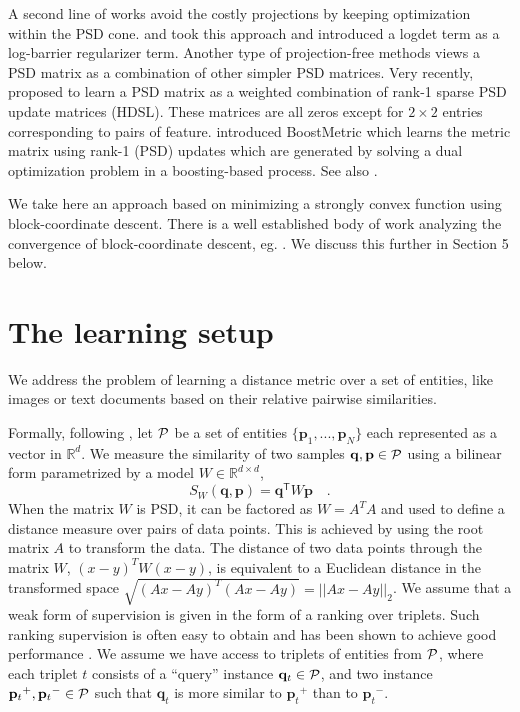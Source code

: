 \documentclass{article} %
\newcommand\mat[1]{{#1}}
\renewcommand\vec[1]{\mathbf{#1}}
\newcommand{\T}{{}^\mathsf{T}}
\newcommand{\W}{\mat{W}}
\newcommand{\Rd}{\mathbb{R}^d}
\newcommand{\q}{{\vec{q}}}
\newcommand{\p}{{\vec{p}}}
\newcommand{\trip}{{t}}
\newcommand{\qt}{{\q_{\trip}}}
\newcommand{\pt}{{\p_{\trip}}}
\begin{document}
A second line of works avoid the costly projections by keeping optimization within the PSD cone.   \citet{davis2007information} and \citet{lego} took this approach and introduced a logdet term as a log-barrier regularizer term. Another type of projection-free methods views a PSD matrix as a combination of other simpler PSD matrices. Very recently, \citet{hdsl} proposed to learn a PSD matrix as a weighted combination of rank-1 sparse PSD update matrices (HDSL). These matrices are all zeros except for $2\times2$ entries corresponding to pairs of feature. \citet{boost} introduced BoostMetric which learns the metric matrix using rank-1 (PSD) updates which are generated by solving a dual optimization problem in a boosting-based process. See also \citet{bi2011adaboost, liu2012robust}.

We take here an approach based on minimizing a strongly convex function using block-coordinate descent. There is a well established body of work analyzing the convergence of block-coordinate descent, eg. \cite{nesterov2012efficiency,richtarik2014iteration}. We discuss this further in Section 5 below.


\section{The learning setup}
We address the problem of learning a distance metric over a set of
entities, like images or text documents based on their
relative pairwise similarities.

Formally, following \citet{OASIS}, let $\cal{P}$ be a set of entities $\{\p_1,...,\p_N\}$ each represented as a vector in $\Rd$. We measure the similarity of two samples $\q, \p \in \cal{P}$ using a bilinear
form parametrized by a model $\W \in \mathbb{R}^{d \times d}$,
\begin{equation}
  S_{\W}(\q, \p) = \q\T \W \p \quad.
\end{equation}
When the matrix $\W$ is PSD, it can be factored as $\W = A^TA$ and used to define a distance measure over pairs of data points. This is achieved by using the root matrix $A$ to transform the data. The distance of two data points through the matrix $\W$, $(x-y)^T\W(x-y)$, is equivalent to a Euclidean distance in the transformed space $\sqrt{(Ax-Ay)^T(Ax-Ay)} = ||Ax-Ay||_2$. We assume that a weak form of supervision is given in the form of a ranking over triplets. Such ranking supervision is often easy to obtain and has been shown to achieve good performance \cite{weinberger2006dml,OASIS,qian}. We assume we have access to triplets of entities from $\cal{P}$, where each triplet $t$ consists of
a ``query'' instance $\qt \in \cal{P}$, and two instance $\pt^{+}, \pt^{-} \in \cal{P}$ such that $\qt$ is more similar to $\pt^{+}$
than to $\pt^{-}$.
\end{document}
